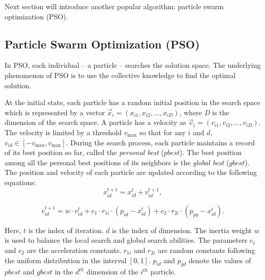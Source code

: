 Next section will introduce another popular algorithm: particle swarm optimization (PSO). 



\subsection{Particle Swarm Optimization (PSO)}
 In PSO, each individual -- a particle -- searches the solution space. The underlying phenomenon of PSO is to use the collective knowledge to find the optimal solution.

 At the initial state, each particle has a random initial position in the search space which is represented by a vector $\vec{x}_i = (x_{i1}, x_{i2}, \dots, x_{iD})$, where \emph{D} is the dimension of the search space. A particle has a velocity as $\vec{v}_i = (v_{i1}, v_{i2}, \dots, v_{iD})$. The velocity is limited by a threshold $v_{\max}$ so that for any $i$ and $d$, $v_{id} \in [-v_{\max}, v_{\max}]$. During the search process, each particle maintains a record of its best position so far, called the \emph{personal best} ($pbest$). The best position among all the personal best positions of its neighbors is the \emph{global best} ($gbest$). The position and velocity of each particle are updated according to the following equations:
\begin{equation}
\label{eq:updatePosition}
x^{t+1}_{id} = x^{t}_{id} + v^{t+1}_{id},
\end{equation}

\begin{equation}
\label{eq:updateVelocity}
v^{t+1}_{id} = w \cdot v^{t}_{id} + c_1 \cdot r_{1i} \cdot (p_{id} - x^t_{id}) + c_2 \cdot r_{2i} \cdot (p_{pg} - x^i_{id}).
\end{equation}

Here, $t$ is the index of iteration. $d$ is the index of dimension. The inertia weight $w$ is used to balance the local search and global search abilities. The parameters $c_1$ and $c_2$ are the acceleration constants. $r_{1i}$ and $r_{2i}$ are random constants following the uniform distribution in the interval $[0, 1]$. $p_{id}$ and $p_{gd}$ denote the values of $pbest$ and $gbest$ in the $d^{th}$ dimension of the $i^{th}$ particle.

